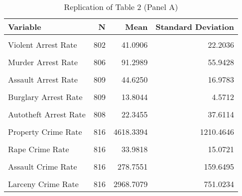 \begin{table}[H]

\caption{\label{tab:tab:replicatetable2a}Replication of Table 2 (Panel A)}
\centering
\begin{tabular}[t]{lrrr}
\toprule
Variable & N & Mean & Standard Deviation\\
\midrule
\cellcolor{gray!6}{Shalll} & \cellcolor{gray!6}{816} & \cellcolor{gray!6}{0.1912} & \cellcolor{gray!6}{0.3935}\\
Violent Arrest Rate & 802 & 41.0906 & 22.2036\\
\cellcolor{gray!6}{Property Arrest Rate} & \cellcolor{gray!6}{809} & \cellcolor{gray!6}{16.9180} & \cellcolor{gray!6}{4.6770}\\
Murder Arrest Rate & 806 & 91.2989 & 55.9428\\
\cellcolor{gray!6}{Rape Arrest Rate} & \cellcolor{gray!6}{799} & \cellcolor{gray!6}{41.0231} & \cellcolor{gray!6}{17.3887}\\
\addlinespace
Assault Arrest Rate & 809 & 44.6250 & 16.9783\\
\cellcolor{gray!6}{Robery Arrest Rate} & \cellcolor{gray!6}{808} & \cellcolor{gray!6}{31.4581} & \cellcolor{gray!6}{13.5928}\\
Burglary Arrest Rate & 809 & 13.8044 & 4.5712\\
\cellcolor{gray!6}{Larceny Arrest Rate} & \cellcolor{gray!6}{809} & \cellcolor{gray!6}{18.5372} & \cellcolor{gray!6}{5.1961}\\
Autotheft Arrest Rate & 808 & 22.3455 & 37.6114\\
\addlinespace
\cellcolor{gray!6}{Violent Crime Rate} & \cellcolor{gray!6}{816} & \cellcolor{gray!6}{483.9260} & \cellcolor{gray!6}{318.9425}\\
Property Crime Rate & 816 & 4618.3394 & 1210.4646\\
\cellcolor{gray!6}{Murder Crime Rate} & \cellcolor{gray!6}{816} & \cellcolor{gray!6}{7.7683} & \cellcolor{gray!6}{6.8817}\\
Rape Crime Rate & 816 & 33.9818 & 15.0721\\
\cellcolor{gray!6}{Robbery Crime Rate} & \cellcolor{gray!6}{816} & \cellcolor{gray!6}{163.4208} & \cellcolor{gray!6}{176.2506}\\
\addlinespace
Assault Crime Rate & 816 & 278.7551 & 159.6495\\
\cellcolor{gray!6}{Burglary Crime Rate} & \cellcolor{gray!6}{816} & \cellcolor{gray!6}{1239.3364} & \cellcolor{gray!6}{417.7576}\\
Larceny Crime Rate & 816 & 2968.7079 & 751.0234\\

\end{tabular}
\end{table}

